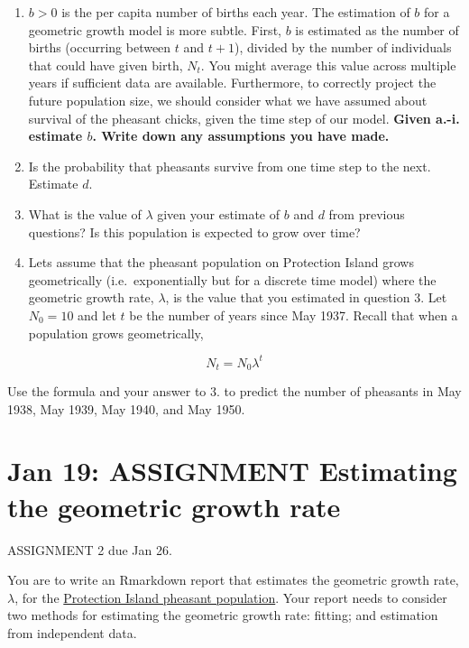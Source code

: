 \documentclass[
]{book}
\begin{document}
\begin{enumerate}
\def\labelenumi{\arabic{enumi}.}
\item
  \(b > 0\) is the per capita number of births each year. The estimation of \(b\) for a geometric growth model is more subtle. First, \(b\) is estimated as the number of births (occurring between \(t\) and \(t+1\)), divided by the number of individuals that could have given birth, \(N_t\). You might average this value across multiple years if sufficient data are available. Furthermore, to correctly project the future population size, we should consider what we have assumed about survival of the pheasant chicks, given the time step of our model. \textbf{Given a.-i. estimate \(b\). Write down any assumptions you have made.}
\item
  Is the probability that pheasants survive from one time step to the next. Estimate \(d\).
\item
  What is the value of \(\lambda\) given your estimate of \(b\) and \(d\) from previous questions? Is this population is expected to grow over time?
\item
  Lets assume that the pheasant population on Protection Island grows geometrically (i.e.~exponentially but for a discrete time model) where the geometric growth rate, \(\lambda\), is the value that you estimated in question 3. Let \(N_0 = 10\) and let \(t\) be the number of years since May 1937. Recall that when a population grows geometrically,
\end{enumerate}

\[ N_t = N_0 \lambda^t \]

Use the formula and your answer to 3. to predict the number of pheasants in May 1938, May 1939, May 1940, and May 1950.

\hypertarget{estimate}{%
\chapter{\texorpdfstring{Jan 19: \textbf{ASSIGNMENT} Estimating the geometric growth rate}{Jan 19: ASSIGNMENT Estimating the geometric growth rate}}\label{estimate}}

ASSIGNMENT 2 due Jan 26.

You are to write an Rmarkdown report that estimates the geometric growth rate, \(\lambda\), for the \protect\hyperlink{pheasant}{Protection Island pheasant population}. Your report needs to consider two methods for estimating the geometric growth rate: fitting; and estimation from independent data.
\end{document}
